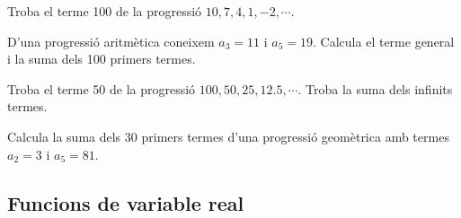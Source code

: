 \begin{mylist}
	\exer[1] Troba el terme 100 de la progressió $10, 7, 4, 1, -2, \cdots$.
	
	\exer[1] D'una progressió aritmètica coneixem $a_3=11$ i $a_5=19$. Calcula el terme general i la suma dels 100 primers termes.
	
	\exer[1] Troba el terme 50 de la progressió $100, 50, 25, 12.5, \cdots$. Troba la suma dels infinits termes.
	
	\exer[1] Calcula la suma dels 30 primers termes d'una progressió geomètrica amb termes \linebreak $a_2=3$ i $a_5=81$.
	
\end{mylist}

\subsection{Funcions de variable real}

